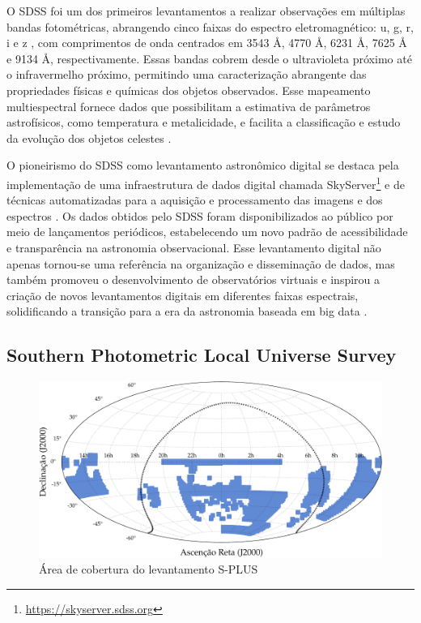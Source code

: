 O SDSS foi um dos primeiros levantamentos a realizar observações em múltiplas bandas fotométricas, abrangendo cinco faixas do espectro eletromagnético: u, g, r, i e z \cite{sdss-filters}, com comprimentos de onda centrados em 3543 $\si{\angstrom}$, 4770 $\si{\angstrom}$, 6231 $\si{\angstrom}$, 7625 $\si{\angstrom}$ e 9134 $\si{\angstrom}$, respectivamente. Essas bandas cobrem desde o ultravioleta próximo até o infravermelho próximo, permitindo uma caracterização abrangente das propriedades físicas e químicas dos objetos observados. Esse mapeamento multiespectral fornece dados que possibilitam a estimativa de parâmetros astrofísicos, como temperatura e metalicidade, e facilita a classificação e estudo da evolução dos objetos celestes \cite{sdss-photo}.

O pioneirismo do SDSS como levantamento astronômico digital se destaca pela implementação de uma infraestrutura de dados digital chamada SkyServer\footnote{\url{https://skyserver.sdss.org}} \cite{skyserver} e de técnicas automatizadas para a aquisição e processamento das imagens \cite{sdss-photo} e dos espectros \cite{sdss-spec}. Os dados obtidos pelo SDSS foram disponibilizados ao público por meio de lançamentos periódicos, estabelecendo um novo padrão de acessibilidade e transparência na astronomia observacional. Esse levantamento digital não apenas tornou-se uma referência na organização e disseminação de dados, mas também promoveu o desenvolvimento de observatórios virtuais e inspirou a criação de novos levantamentos digitais em diferentes faixas espectrais, solidificando a transição para a era da astronomia baseada em big data \cite{sciserver}.





\subsection{Southern Photometric Local Universe Survey}
\label{sec:splus}

\begin{figure}[!ht]
  \caption{Área de cobertura do levantamento S-PLUS}
  \label{fig:coverage-splus}
  \includegraphics[width=\linewidth]{notebooks/plots/splus_footprint.pdf}
\end{figure}

